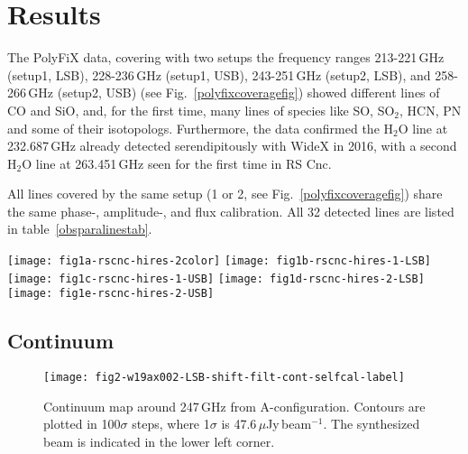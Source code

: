 \documentclass{aa}
\begin{document}
\section{Results} \label{resusec}

The PolyFiX data, covering with two setups the frequency ranges
213-221\,GHz (setup1, LSB), 228-236\,GHz (setup1, USB), 243-251\,GHz
(setup2, LSB), and 258-266\,GHz (setup2, USB) (see
Fig.~\ref{polyfixcoveragefig}) showed different lines of CO and SiO,
and, for the first time, many lines of species like SO, SO$_2$, HCN,
PN and some of their isotopologs. Furthermore, the data confirmed
the H$_2$O line at 232.687\,GHz already detected serendipitously with
WideX in 2016, with a second H$_2$O line at 263.451\,GHz seen for the
first time in RS Cnc.

All lines covered by the same setup (1 or 2, see
Fig.~\ref{polyfixcoveragefig}) share the same phase-, amplitude-, and
flux calibration. All 32 detected lines are listed in
table~\ref{obsparalinestab}.

\begin{figure*}
    \centering
    \vspace{-3.0cm}
    \texttt{[image: fig1a-rscnc-hires-2color]}
    \vspace{-2.00cm} 
    \texttt{[image: fig1b-rscnc-hires-1-LSB]}
    \texttt{[image: fig1c-rscnc-hires-1-USB]}
    \texttt{[image: fig1d-rscnc-hires-2-LSB]}
    \texttt{[image: fig1e-rscnc-hires-2-USB]}
    \caption{Overview of the frequency ranges observed with PolyFiX using two 
             spectral setups (setup1: red and setup2: blue, respectively).
             Lower diagrams: Zoom on the individual spectra covering 7.8\,GHz 
             each.
             Upper row: setup1, 
             lower row: setup2. The central 20\,MHz at the border between 
             inner and outer baseband are blanked out, i.e., set to zero, as 
             this region is contaminated by the LO2 separation of the 8\,GHz 
             wide IF in the IF processor ("LO2 zone").}
    \label{polyfixcoveragefig}
\end{figure*}

\subsection{Continuum}\label{contsec}

\begin{figure}[t]
    \centering
    \texttt{[image: fig2-w19ax002-LSB-shift-filt-cont-selfcal-label]}
    \caption{Continuum map around 247\,GHz from A-configuration. 
             Contours are plotted in 100$\sigma$ steps, 
             where 1$\sigma$ is 47.6\,$\mu$Jy\,beam$^{-1}$.
             The synthesized beam is indicated in the lower left corner.}
    \label{contmapfig}
\end{figure}
\end{document}
